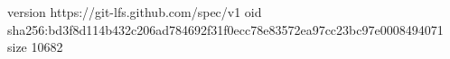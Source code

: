 version https://git-lfs.github.com/spec/v1
oid sha256:bd3f8d114b432c206ad784692f31f0ecc78e83572ea97cc23bc97e0008494071
size 10682
